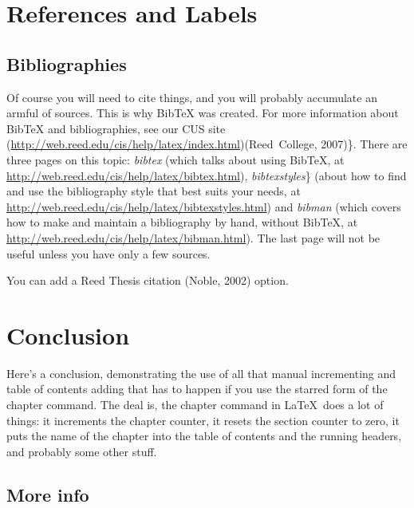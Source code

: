 \documentclass[12pt,twoside]{reedthesis}
\begin{document}
  \chapter{References and Labels}
  
  \section{Bibliographies}\label{bibliographies}
  
  Of course you will need to cite things, and you will probably accumulate
  an armful of sources. This is why BibTeX was created. For more
  information about BibTeX and bibliographies, see our CUS site
  (\url{http://web.reed.edu/cis/help/latex/index.html})(Reed~College,
  2007)\}. There are three pages on this topic: \emph{bibtex} (which talks
  about using BibTeX, at
  \url{http://web.reed.edu/cis/help/latex/bibtex.html}),
  \emph{bibtexstyles}\} (about how to find and use the bibliography style
  that best suits your needs, at
  \url{http://web.reed.edu/cis/help/latex/bibtexstyles.html}) and
  \emph{bibman} (which covers how to make and maintain a bibliography by
  hand, without BibTeX, at
  \url{http://web.reed.edu/cis/help/latex/bibman.html}). The last page
  will not be useful unless you have only a few sources.
  
  You can add a Reed Thesis citation (Noble, 2002) option.
  
  \chapter*{Conclusion}
  
  
   
  \setcounter{chapter}{3} \setcounter{section}{0}
  
  Here's a conclusion, demonstrating the use of all that manual
  incrementing and table of contents adding that has to happen if you use
  the starred form of the chapter command. The deal is, the chapter
  command in \LaTeX~does a lot of things: it increments the chapter
  counter, it resets the section counter to zero, it puts the name of the
  chapter into the table of contents and the running headers, and probably
  some other stuff.
  
  \section{More info}
  
\end{document}
